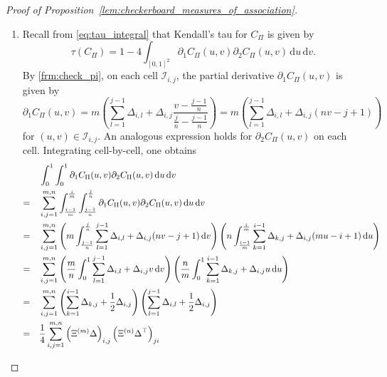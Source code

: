 \documentclass{article}
\theoremstyle{definition}
\newcommand{\II}{\mathcal{I}}  %
\newcommand{\de}{\mathrm{\,d}}
\begin{document}
\begin{proof}[Proof of Proposition~\ref{lem:checkerboard_measures_of_association}]
\begin{enumerate}[label=(\roman*)]
\[        .\]
        Hence,
        \[
        \rho_S(C_{\nearrow})
        = \rho_S(C_{\Pi}) + \frac1{mn}
        \]
        as stated.
        Similarly, for $C_{\searrow}$, one obtains from \eqref{frm:check_w} that
        \[
            \int_{\frac{i-1}{m}}^{\frac{i}{m}}\int_{\frac{j-1}{n}}^{\frac{j}{n}} C_{\searrow}(u,v) \de v\de u
            = \frac{1}{mn}\left(\sum_{k,l=1}^{i-1,j-1}\Delta_{k,l} + \frac1{2}\sum_{k=1}^{i-1}\Delta_{k,j} + \frac1{2}\sum_{l=1}^{j-1}\Delta_{i,l} + \frac1{6}\Delta_{i,j}\right)
        ,\]
        leading to the stated result.
        \item Recall from \eqref{eq:tau_integral} that Kendall's tau for $C_{\Pi}$ is given by
        \[
            \tau(C_{\Pi}) = 1 - 4\int_{[0,1]^2} \partial_1 C_{\Pi}(u,v) \partial_2 C_{\Pi}(u,v) \de u \de v
        .\]
        By \eqref{frm:check_pi}, on each cell $\II_{i,j}$, the partial derivative $\partial_1 C_{\Pi}(u,v)$ is given by
        \[
        \partial_1 C_{\Pi}(u,v)
        = m\left(\sum_{l=1}^{j-1} \Delta_{i,l} + \Delta_{i,j} \frac{v-\frac{j-1}n}{\frac{j}n - \frac{j-1}n}\right)
        = m\left(\sum_{l=1}^{j-1} \Delta_{i,l} + \Delta_{i,j} (nv-j+1)\right)
        \]
        for $(u,v)\in\II_{i,j}$.
        An analogous expression holds for $\partial_2 C_{\Pi}(u,v)$ on each cell.
        Integrating cell-by-cell, one obtains
        \begin{align*}
            &\int_0^1\int_0^1 \partial_1 C_{\Pi}(u,v) \partial_2 C_{\Pi}(u,v) \de u \de v \\
            = \quad & \sum_{i,j=1}^{m,n} \int_{\frac{i-1}m}^{\frac{i}m} \int_{\frac{j-1}n}^{\frac{j}n} \partial_1 C_{\Pi}(u,v) \partial_2 C_{\Pi}(u,v) \de u \de v \\
            = \quad & \sum_{i,j=1}^{m,n} \left(m\int_{\frac{j-1}n}^{\frac{j}n} \sum_{l=1}^{j-1} \Delta_{i,l} + \Delta_{i,j} (nv-j+1) \de v \right) \left(n\int_{\frac{i-1}m}^{\frac{i}m} \sum_{k=1}^{i-1} \Delta_{k,j} + \Delta_{i,j} (mu-i+1) \de u \right)\allowdisplaybreaks\\
            = \quad & \sum_{i,j=1}^{m,n}\left(\frac{m}{n}\int_{0}^{1} \sum_{l=1}^{j-1} \Delta_{i,l} + \Delta_{i,j} v \de v \right) \left(\frac{n}{m}\int_{0}^{1} \sum_{k=1}^{i-1} \Delta_{k,j} + \Delta_{i,j} u \de u\right) \allowdisplaybreaks \\ 
            = \quad & \sum_{i,j=1}^{m,n} \left(\sum_{k=1}^{i-1} \Delta_{k,j} + \frac12 \Delta_{i,j}\right)\left(\sum_{l=1}^{j-1} \Delta_{i,l} + \frac12 \Delta_{i,j}\right) \allowdisplaybreaks\\
            = \quad & \frac14 \sum_{i,j=1}^{m,n} \left(\Xi^{(m)} \Delta\right)_{i,j}\left(\Xi^{(n)} \Delta^{\top}\right)_{ji} \\

\end{align*}
\end{enumerate}
\end{proof}
\end{document}
